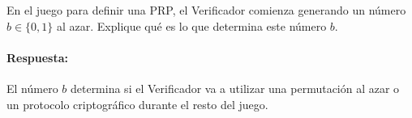 
En el juego para definir una PRP, el Verificador comienza generando un número $b\in\{0,1\}$ al azar. Explique qué es lo que determina este número $b$.
\paragraph{Respuesta:} El número $b$ determina si el Verificador va a utilizar una permutación al azar o un protocolo criptográfico durante el resto del juego.
